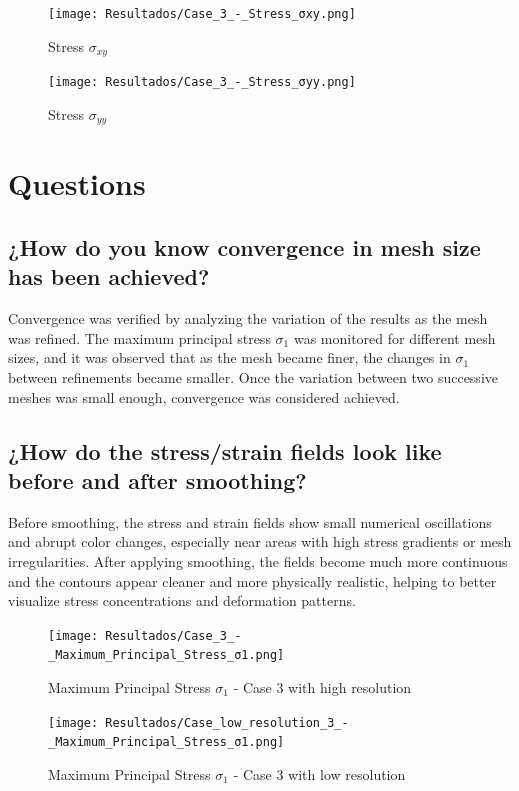 \documentclass[12pt]{article}
\begin{document}
\begin{figure}[H]
    \centering
    \begin{minipage}{0.48\textwidth}
        \centering
        \texttt{[image: Resultados/Case\_3\_-\_Stress\_σxy.png]}
        \caption{Stress $\sigma_{xy}$}
        \label{fig:fig32}
    \end{minipage}
    \hfill
    \begin{minipage}{0.48\textwidth}
        \centering
        \texttt{[image: Resultados/Case\_3\_-\_Stress\_σyy.png]}
        \caption{Stress $\sigma_{yy}$}
        \label{fig:fig33}
    \end{minipage}
\end{figure}

\newpage
\section{Questions}

\subsection{¿How do you know convergence in mesh size has been achieved?}

Convergence was verified by analyzing the variation of the results as the mesh was refined.  
The maximum principal stress $\sigma_1$ was monitored for different mesh sizes, and it was observed that as the mesh became finer, the changes in $\sigma_1$ between refinements became smaller.  
Once the variation between two successive meshes was small enough, convergence was considered achieved.

\subsection{¿How do the stress/strain fields look like before and after smoothing?}

Before smoothing, the stress and strain fields show small numerical oscillations and abrupt color changes, especially near areas with high stress gradients or mesh irregularities.  
After applying smoothing, the fields become much more continuous and the contours appear cleaner and more physically realistic, helping to better visualize stress concentrations and deformation patterns.
\\
\begin{figure}[H]
    \centering
    \begin{minipage}{0.48\textwidth}
        \centering
        \texttt{[image: Resultados/Case\_3\_-\_Maximum\_Principal\_Stress\_σ1.png]}
        \caption{Maximum Principal Stress $\sigma_1$ - Case 3 with high resolution}
        \label{fig:stress_case1_high}
    \end{minipage}
    \hfill
    \begin{minipage}{0.48\textwidth}
        \centering
        \texttt{[image: Resultados/Case\_low\_resolution\_3\_-\_Maximum\_Principal\_Stress\_σ1.png]}
        \caption{Maximum Principal Stress $\sigma_1$ - Case 3 with low resolution}
        \label{fig:stress_case3_low}
    \end{minipage}
\end{figure}
\end{document}
